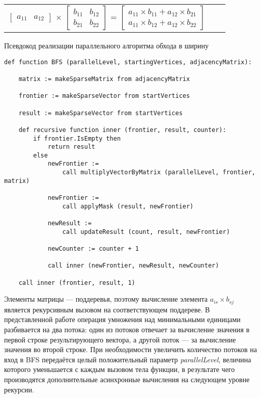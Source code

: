 \begin{center}
    \begin{tabular}{ccc}
        $\begin{bmatrix} a_{11} & a_{12} \end{bmatrix}$
        $\times$
        $\begin{bmatrix} b_{11} & b_{12} \\ b_{21} & b_{22} \end{bmatrix}$
        =
        $\begin{bmatrix} a_{11} \times b_{11} + a_{12} \times b_{21} \\ a_{11} \times b_{12} + a_{12} \times b_{22} \end{bmatrix}$
    \end{tabular}
\end{center}

\lstset{style=codelistingstyle}

\begin{algorithm}[ht]
\caption{Псевдокод реализации параллельного алгоритма обхода в ширину}
\label{alg:bfs_example}
\begin{lstlisting}[language=pseudoFSharp]
def function BFS (parallelLevel, startingVertices, adjacencyMatrix):

    matrix := makeSparseMatrix from adjacencyMatrix
    
    frontier := makeSparseVector from startVertices
    
    result := makeSparseVector from startVertices

    def recursive function inner (frontier, result, counter):
        if frontier.IsEmpty then
            return result
        else
            newFrontier :=
                call multiplyVectorByMatrix (parallelLevel, frontier, matrix)
                
            newFrontier :=
                call applyMask (result, newFrontier)

            newResult :=
                call updateResult (count, result, newFrontier)

            newCounter := counter + 1
            
            call inner (newFrontier, newResult, newCounter)

    call inner (frontier, result, 1)
\end{lstlisting}
\end{algorithm}

Элементы матрицы --- поддеревья, поэтому вычисление элемента $a_{is} \times b_{sj}$ является рекурсивным вызовом на соответствующем поддереве. В представленной работе операция умножения над минимальными единицами разбивается на два потока: один из потоков отвечает за вычисление значения в первой строке результирующего вектора, а другой поток --- за вычисление значения во второй строке. При необходимости увеличить количество потоков на вход в BFS передаётся целый положительный параметр \textit{parallelLevel}, величина которого уменьшается с каждым вызовом тела функции, в результате чего производятся дополнительные асинхронные вычисления на следующем уровне рекурсии.